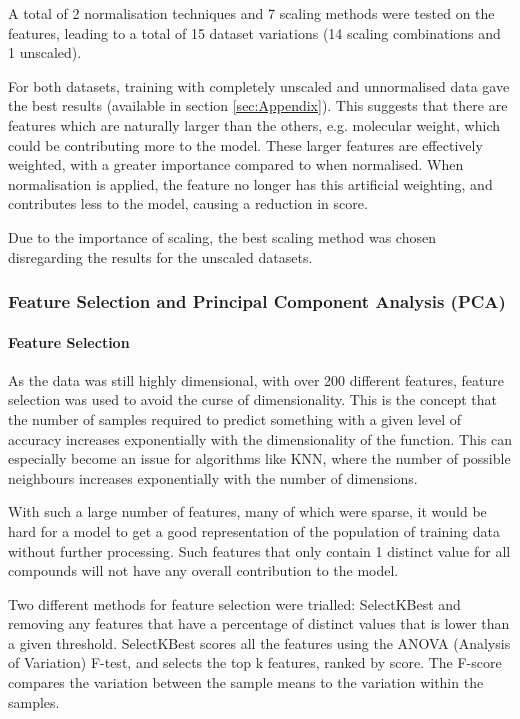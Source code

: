 \documentclass[11pt, titlepage]{article}
\begin{document}
A total of 2 normalisation techniques and 7 scaling methods were tested on the features, leading to a total of 15 dataset variations (14 scaling combinations and 1 unscaled). 

For both datasets, training with completely unscaled and unnormalised data gave the best results (available in section \ref{sec:Appendix}). This suggests that there are features which are naturally larger than the others, e.g. molecular weight, which could be contributing more to the model. These larger features are effectively weighted, with a greater importance compared to when normalised. When normalisation is applied, the feature no longer has this artificial weighting, and contributes less to the model, causing a reduction in score. 

Due to the importance of scaling, the best scaling method was chosen disregarding the results for the unscaled datasets.

\subsubsection{Feature Selection and Principal Component Analysis (PCA)}
\label{subsec:FeatureSelection+PCA}
\paragraph*{Feature Selection} As the data was still highly dimensional, with over 200 different features, feature selection was used to avoid the curse of dimensionality. This is the concept that the number of samples required to predict something with a given level of accuracy increases exponentially with the dimensionality of the function. This can especially become an issue for algorithms like KNN, where the number of possible neighbours increases exponentially with the number of dimensions\cite{CoD_Definition}.

With such a large number of features, many of which were sparse, it would be hard for a model to get a good representation of the population of training data without further processing. Such features that only contain 1 distinct value for all compounds will not have any overall contribution to the model\cite{CoD}.

Two different methods for feature selection were trialled: SelectKBest\cite{SelectKBest} and removing any features that have a percentage of distinct values that is lower than a given threshold. SelectKBest scores all the features using the ANOVA (Analysis of Variation) F-test, and selects the top k features, ranked by score. The F-score compares the variation between the sample means to the variation within the samples. 
\end{document}
